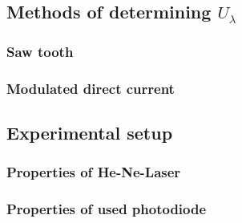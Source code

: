 \subsection{Methods of determining $U_\lambda$}
\subsubsection{Saw tooth}
\subsubsection{Modulated direct current}

\subsection{Experimental setup}
\subsubsection{Properties of He-Ne-Laser}
\subsubsection{Properties of used photodiode}
